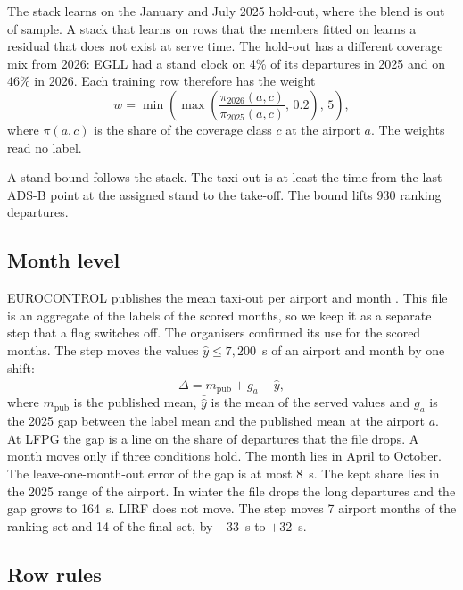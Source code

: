\documentclass[
  manuscript=article,
  layout=preprint,
  year=2026,
  volume=x,
]{extra/joas}
\begin{document}
The stack learns on the January and July 2025 hold-out, where the blend is out of sample. A stack that learns on rows that the members fitted on learns a residual that does not exist at serve time. The hold-out has a different coverage mix from 2026: EGLL had a stand clock on 4\% of its departures in 2025 and on 46\% in 2026. Each training row therefore has the weight
\begin{equation}
\label{eq:weight}
w = \min\!\left(\max\!\left(\frac{\pi_{2026}(a, c)}{\pi_{2025}(a, c)},\, 0.2\right),\, 5\right),
\end{equation}
where $\pi(a, c)$ is the share of the coverage class $c$ at the airport $a$. The weights read no label.

A stand bound follows the stack. The taxi-out is at least the time from the last ADS-B point at the assigned stand to the take-off. The bound lifts 930 ranking departures.

\subsection{Month level}

EUROCONTROL publishes the mean taxi-out per airport and month \cite{eurocontrolperf}. This file is an aggregate of the labels of the scored months, so we keep it as a separate step that a flag switches off. The organisers confirmed its use for the scored months. The step moves the values $\hat{y} \le 7{,}200$~s of an airport and month by one shift:
\begin{equation}
\label{eq:month}
\Delta = m_{\mathrm{pub}} + g_{a} - \bar{\hat{y}},
\end{equation}
where $m_{\mathrm{pub}}$ is the published mean, $\bar{\hat{y}}$ is the mean of the served values and $g_{a}$ is the 2025 gap between the label mean and the published mean at the airport $a$. At LFPG the gap is a line on the share of departures that the file drops. A month moves only if three conditions hold. The month lies in April to October. The leave-one-month-out error of the gap is at most 8~s. The kept share lies in the 2025 range of the airport. In winter the file drops the long departures and the gap grows to 164~s. LIRF does not move. The step moves 7 airport months of the ranking set and 14 of the final set, by $-33$~s to $+32$~s.

\subsection{Row rules}
\end{document}
